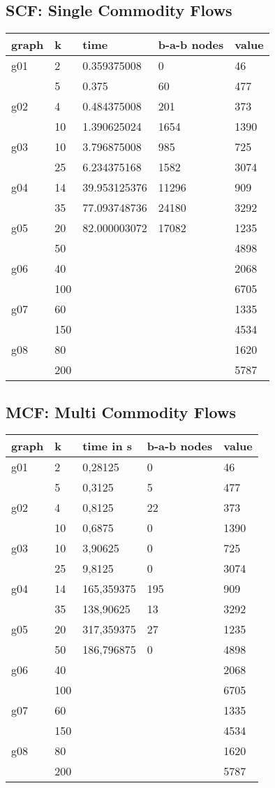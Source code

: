\subsection{SCF: Single Commodity Flows}
\begin{tabular}{l l l l l}
graph	&	k	&	time		&	b-a-b nodes &	value	\\ \hline
g01	&	2	&	0.359375008	&	0	&	46	\\
	&	5	&	0.375		&	60	&	477	\\ \hline
g02	&	4	&	0.484375008	&	201	&	373	\\
	&	10	&	1.390625024	&	1654	&	1390	\\ \hline
g03	&	10	&	3.796875008	&	985	&	725	\\
	&	25	&	6.234375168	&	1582	&	3074	\\ \hline
g04	&	14	&	39.953125376	&	11296	&	909	\\
	&	35	&	77.093748736	&	24180	&	3292	\\ \hline
g05	&	20	&	82.000003072	&	17082	&	1235	\\
	&	50	&			&		&	4898	\\ \hline
g06	&	40	&			&		&	2068	\\
	&	100	&			&		&	6705	\\ \hline
g07	&	60	&			&		&	1335	\\
	&	150	&			&		&	4534	\\ \hline
g08	&	80	&			&		&	1620	\\
	&	200	&			&		&	5787	\\ \hline
\end{tabular}


\subsection{MCF: Multi Commodity Flows}
\begin{tabular}{l l l l l}
graph	&	k	&	time in s	&	b-a-b nodes &	value	\\ \hline
g01	&	2	&	0,28125 	&	0	&	46	\\
	&	5	&	0,3125 		&	5	&	477	\\ \hline
g02	&	4	&	0,8125 		&	22	&	373	\\
	&	10	&	0,6875 		&	0	&	1390	\\ \hline
g03	&	10	&	3,90625 	&	0	&	725	\\
	&	25	&	9,8125 		&	0	&	3074	\\ \hline
g04	&	14	&	165,359375 	&	195	&	909	\\
	&	35	&	138,90625 	&	13	&	3292	\\ \hline
g05	&	20	&	317,359375 	&	27	&	1235	\\
	&	50	&	186,796875 	&	0	&	4898	\\ \hline
g06	&	40	&			&		&	2068	\\
	&	100	&			&		&	6705	\\ \hline
g07	&	60	&			&		&	1335	\\
	&	150	&			&		&	4534	\\ \hline
g08	&	80	&			&		&	1620	\\
	&	200	&			&		&	5787	\\ \hline
\end{tabular}


